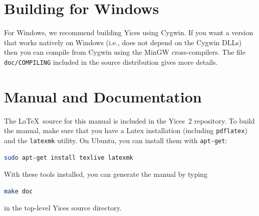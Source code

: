 \documentclass[11pt,twoside,fleqn,openright,titlepage]{cslreport}
\begin{document}
\section{Building for Windows}

For Windows, we recommend building Yices using Cygwin. If you want a
version that works natively on Windows (i.e., does not depend on the
Cygwin DLLs) then you can compile from Cygwin using the MinGW
cross-compilers.  The file \texttt{doc/COMPILING} included in the
source distribution gives more details.

\section{Manual and Documentation}

The \LaTeX\ source for this manual is included in the Yices~2
repository.  To build the manual, make sure that you have a Latex
installation (including \texttt{pdflatex}) and the \texttt{latexmk} utility.
On Ubuntu, you can install them with \texttt{apt-get}:
\begin{small}
\begin{lstlisting}[language=sh]
  sudo apt-get install texlive latexmk
\end{lstlisting}
\end{small}
With these tools installed, you can generate the manual by typing
\begin{small}
\begin{lstlisting}[language=sh]
  make doc
\end{lstlisting}
\end{small}
in the top-level Yices source directory.
\end{document}
